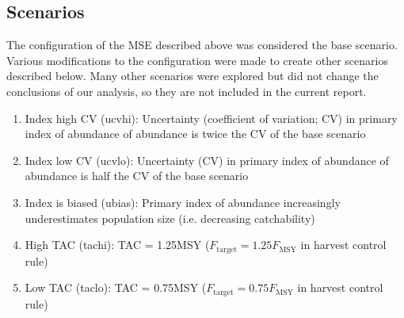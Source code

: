 \documentclass[12pt,english]{article}
\begin{document}
\begin{flushleft}
\begin{spacing}{1.9}
\subsection*{Scenarios}

The configuration of the MSE described above was considered the base scenario. Various modifications to the configuration were made to create other scenarios described below. Many other scenarios were explored but did not change the conclusions of our analysis, so they are not included in the current report.

\begin{enumerate}
\item Index high CV (ucvhi): Uncertainty (coefficient of variation; CV) in primary index of abundance of abundance is twice the CV of the base scenario
\item Index low CV (ucvlo): Uncertainty (CV) in primary index of abundance of abundance is half the CV of the base scenario
\item Index is biased (ubias): Primary index of abundance increasingly underestimates population size (i.e. decreasing catchability)
\item High TAC (tachi): TAC = 1.25MSY ($F_{\mathrm{target}} = 1.25F_{\mathrm{MSY}}$ in harvest control rule)
\item Low TAC (taclo): TAC = 0.75MSY ($F_{\mathrm{target}} = 0.75F_{\mathrm{MSY}}$ in harvest control rule)


\end{enumerate}
\end{spacing}
\end{flushleft}
\end{document}

